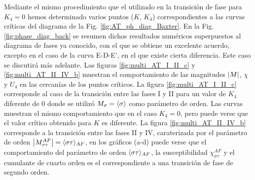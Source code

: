 Mediante el mismo procedimiento que el utilizado en la transición de fase para $K_{4}=0$ %
 hemos determinado varios puntos ($K$, $K_{4}$) correspondientes a las curvas cr\'iticas del diagrama
 de la Fig. \ref{fig:AT_ph_diag_Baxter}. En la Fig. \ref{fig:phase_diag_back} se resumen
 dichos resultados numéricos superpuestos al diagrama de fases ya conocido, con el que se obtiene un excelente acuerdo,
 excepto en el caso de la curva E-D-E', en el que existe cierta diferencia. Este caso se discutirá más adelante.
Las figuras \ref{fig:multi_AT_I_II_c} y \ref{fig:multi_AT_II_IV_b} muestran el comportamiento
 de las magnitudes $\left\vert M\right\vert$, $\chi$ y $U_{4}$ en las cercanías de los puntos críticos.
 La figura \ref{fig:multi_AT_I_II_c} corresponde al caso de
 la transición entre las fases I y II para un valor de $K_{4}$ diferente de $0$ donde se utiliz\'o
 $M_{\sigma}=\langle \sigma \rangle$ como par\'ametro de orden. Las curvas muestran el mismo comportamiento que en el caso
 $K_{4}=0$, pero puede verse que el valor crítico obtenido para $K$ es diferente.
 La figura \ref{fig:multi_AT_II_IV_b}
  corresponde a la transici\'on entre las fases II y IV, caraterizada por el parámetro de orden $\left\vert M_{\sigma\tau}^{AF}\right\vert=\langle \sigma\tau \rangle_{AF}$,
  en los gr\'aficos (a-d) puede verse que el
  comportamiento del par\'ametro de orden $\langle \sigma\tau \rangle_{AF}$, la susceptibilidad $\chi_{\sigma\tau}^{AF}$
  y el cumulante de cuarto orden es el correspondiente a una transici\'on de fase de segundo orden.\\
 
